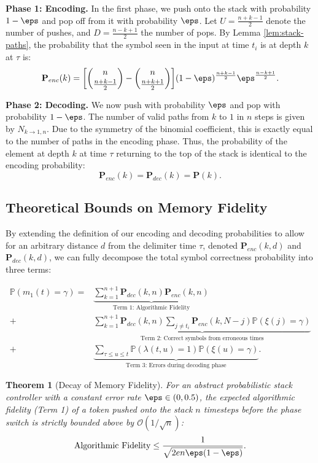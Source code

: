 \documentclass[10pt]{article} %
\newtheorem{theorem}{Theorem}
\begin{document}
\textbf{Phase 1: Encoding.} In the first phase, we push onto the stack with probability $1- \eps$ and pop off from it with probability $\eps$. Let $U = \frac{n + k-1}{2}$ denote the number of pushes, and $D = \frac{n-k+1}{2}$ the number of pops. By Lemma \ref{lem:stack-paths}, the probability that the symbol seen in the input at time $t_i$ is at depth $k$ at $\tau$ is:
$$
\mathbf{P}_{enc}(k) = \bigg[\binom{n}{\frac{n+k-1}{2}} - \binom{n}{\frac{n+k + 1}{2}}\bigg] (1- \eps)^{\frac{n + k-1}{2}} \eps^{\frac{n-k+1}{2}}.
$$

\textbf{Phase 2: Decoding.} We now push with probability $\eps$ and pop with probability $1-\eps$. The number of valid paths from $k$ to $1$ in $n$ steps is given by $N_{k \rightarrow 1,n }$. Due to the symmetry of the binomial coefficient, this is exactly equal to the number of paths in the encoding phase. Thus, the probability of the element at depth $k$ at time $\tau$ returning to the top of the stack is identical to the encoding probability:
$$
\mathbf{P}_{enc}(k) = \mathbf{P}_{dec}(k) = \mathbf{P}(k).
$$

\subsection{Theoretical Bounds on Memory Fidelity}

By extending the definition of our encoding and decoding probabilities to allow for an arbitrary distance $d$ from the delimiter time $\tau$, denoted $\mathbf{P}_{enc}(k,d)$ and $\mathbf{P}_{dec}(k,d)$, we can fully decompose the total symbol correctness probability into three terms:

\begin{align*}
\mathbb{P}(m_1(t) = \gamma) = &\underbrace{\sum_{k=1}^{n+1} \mathbf{P}_{dec}(k, n) \mathbf{P}_{enc}(k, n)}_{\text{Term 1: Algorithmic Fidelity}} \\ 
+ &\underbrace{\sum_{k=1}^{n+1} \mathbf{P}_{dec}(k, n) \sum_{j \neq t_i} \mathbf{P}_{enc}(k, N-j) \mathbb{P}(\xi(j) = \gamma)}_{\text{Term 2: Correct symbols from erroneous times}} \\ 
+ &\underbrace{\sum_{\tau \leq u \leq t}\mathbb{P}(\lambda(t,u) = 1)\mathbb{P}(\xi(u) = \gamma)}_{\text{Term 3: Errors during decoding phase}}.
\end{align*}

\begin{theorem}[Decay of Memory Fidelity]
\label{thm:decay}
For an abstract probabilistic stack controller with a constant error rate $\eps \in (0, 0.5)$, the expected algorithmic fidelity (Term 1) of a token pushed onto the stack $n$ timesteps before the phase switch is strictly bounded above by $\mathcal{O}(1/\sqrt{n})$:
$$
\text{Algorithmic Fidelity} \leq \frac{1}{\sqrt{2e n \eps(1-\eps)}}.
$$
\end{theorem}
\end{document}
